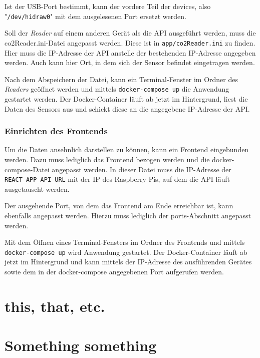 \documentclass[a4paper,
    11pt,
    headings=small,
    ngerman,
    listof=totoc,
    numbers=noenddot]{scrreprt}[2021/11/13]
\begin{document}

Ist der USB-Port bestimmt, kann der vordere Teil der devices, also "\texttt{/dev/hidraw0}"  mit dem ausgelesenen Port ersetzt werden.



Soll der \textit{Reader} auf einem anderen Gerät als die \ac{API} ausgeführt werden, muss die co2Reader.ini-Datei angepasst werden. Diese ist in \texttt{app/co2Reader.ini} zu finden. Hier muss die IP-Adresse der \ac{API} anstelle der bestehenden IP-Adresse angegeben werden. Auch kann hier Ort, in dem sich der Sensor befindet eingetragen werden.

Nach dem Abspeichern der Datei, kann ein Terminal-Fenster im Ordner des \textit{Readers} geöffnet werden und mittels \texttt{docker-compose up} die Anwendung gestartet werden. Der Docker-Container läuft ab jetzt im Hintergrund, liest die Daten des Sensors aus und schickt diese an die angegebene IP-Adresse der \ac{API}.


\subsection{Einrichten des Frontends}

Um die Daten ansehnlich darstellen zu können, kann ein Frontend eingebunden werden. Dazu muss lediglich das Frontend bezogen werden und die docker-compose-Datei angepasst werden. In dieser Datei muss die IP-Adresse der \texttt{REACT\_APP\_API\_URL} mit der IP des Raspberry Pis, auf dem die \ac{API} läuft ausgetauscht werden.

Der ausgehende Port, von dem das Frontend am Ende erreichbar ist, kann ebenfalls angepasst werden. Hierzu muss lediglich der ports-Abschnitt angepasst werden.

Mit dem Öffnen eines Terminal-Fensters im Ordner des Frontends und mittels \texttt{docker-compose up} wird Anwendung gestartet. Der Docker-Container läuft ab jetzt im Hintergrund und kann mittels der IP-Adresse des ausführenden Gerätes sowie dem in der docker-compose angegebenen Port aufgerufen werden.

\newpage

\listoffigures
\listoftables
\lstlistoflistings
\printglossaries
\printbibliography

\newpage

\appendix
{}



\chapter{this, that, etc.}




\chapter{Something something}
\end{document}
